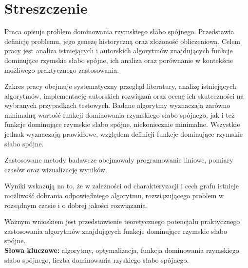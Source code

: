 \chapter*{Streszczenie}
Praca opisuje problem dominowania rzymskiego słabo spójnego. Przedstawia definicję problemu, jego genezę historyczną oraz złożoność obliczeniową. Celem pracy jest analiza istniejących i autorskich algorytmów znajdujących funkcje dominujące rzymskie słabo spójne, ich analiza oraz porównanie w kontekście możliwego praktycznego zastosowania.

Zakres pracy obejmuje systematyczny przegląd literatury, analizę istniejących algorytmów, implementację autorskich rozwiązań oraz ocenę ich skuteczności na wybranych przypadkach testowych. Badane algorytmy wyznaczają zarówno minimalną wartość funkcji dominowania rzymskiego słabo spójnego, jak i też funkcje dominujące rzymskie słabo spójne, niekoniecznie minimalne. Wszystkie jednak wyznaczają prawidłowe, względem definicji funkcje dominujące rzymskie słabo spójne.

Zastosowane metody badawcze obejmowały programowanie liniowe, pomiary czasów oraz wizualizację wyników.

Wyniki wskazują na to, że w zależności od charakteryzacji i cech grafu istnieje możliwość dobrania odpowiedniego algorytmu, rozwiązującego problem w rozsądnym czasie i o dobrej jakości rozwiązania.

Ważnym wnioskiem jest przedstawienie teoretycznego potencjału praktycznego zastosowania algorytmów znajdujących funkcje dominujące rzymskie słabo spójne.\\

\textbf{Słowa kluczowe:} algorytmy, optymalizacja, funkcja dominowania rzymskiego słabo spójnego, liczba dominowania rzyskiego słabo spójnego.
